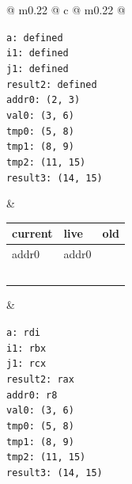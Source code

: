\begin{figure}[H]
    \centering
    \small
    \begin{tabularx}{\textwidth}{@{} m{} @{\extracolsep{\fill}} c @{\extracolsep{\fill}} m{} @{}}
        
        \begin{tcolorbox}[
            standard jigsaw, opacityback=0, 
            colframe=black, arc=4mm, 
            width=\linewidth,
            height=6.2cm, 
            valign=center, 
            left=2pt, right=2pt
        ]
            \texttt{\small a: defined \\ i1: defined \\ j1: defined \\ result2: defined \\ addr0: (2, 3) \\ val0: (3, 6) \\ tmp0: (5, 8) \\ tmp1: (8, 9) \\ tmp2: (11, 15) \\ result3: (14, 15)}
        \end{tcolorbox} 
        & 
        \renewcommand{\arraystretch}{1.3}
        \begin{tabular}{|p{2cm}|p{2cm}|p{2cm}|}
            \hline
            \textbf{current} & \textbf{live} & \textbf{old} \\ \hline
             addr0  & addr0  &  \\ \hline
               &   &    \\ \hline
               &   &    \\ \hline
               &   &    \\ \hline
               &   &    \\ \hline
            & & \\ \hline
        \end{tabular} 
        & 
        \begin{tcolorbox}[
            standard jigsaw, opacityback=0, 
            colframe=black, arc=4mm, 
            width=\linewidth,
            height=6.2cm, 
            valign=center,
            left=2pt, right=2pt
        ]
            \texttt{\small a: rdi \\ i1: rbx \\ j1: rcx \\ result2: rax \\ addr0: r8 \\ val0: (3, 6) \\ tmp0: (5, 8) \\ tmp1: (8, 9) \\ tmp2: (11, 15) \\ result3: (14, 15)}

        \end{tcolorbox} \\
    \end{tabularx}
\end{figure}



